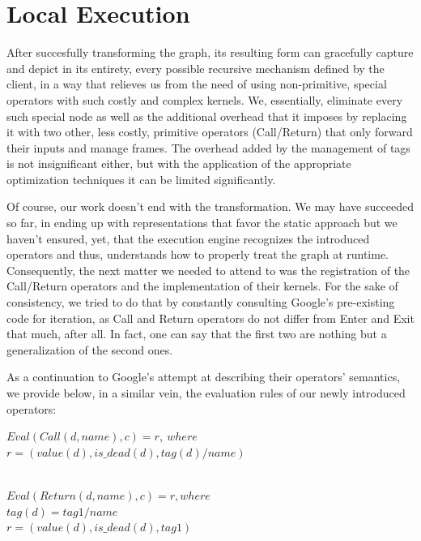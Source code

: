 \documentclass[ack,preface]{dithesis}
\begin{document}
    \section{Local Execution}


After succesfully transforming the graph, its resulting form can gracefully capture and depict in its entirety, every possible recursive mechanism defined by the client, in a way that relieves us from the need of using non-primitive, special operators with such costly and complex kernels. We, essentially,  eliminate every such special node as well as the additional overhead that it imposes by replacing it with two other, less costly, primitive operators (Call/Return) that only forward their inputs and manage frames.  The overhead added by the management of tags is not insignificant either, but with the application of the appropriate optimization techniques it can be limited significantly.

Of course, our work doesn't end with the transformation. We may have succeeded so far, in ending up with representations that favor the static approach but we haven't ensured, yet, that the  execution engine recognizes the introduced operators and thus, understands how to properly treat the graph at runtime. Consequently, the next matter we needed to attend to was the registration of the Call/Return operators and the implementation of their kernels.  For the sake of consistency, we tried to do that by constantly consulting Google's pre-existing code for iteration, as Call and Return operators do not differ from Enter and Exit that much, after all. In fact, one can say that the first two are nothing but a generalization of the second ones. 



\begin{flushleft}
\setlength{\parindent}{20ex}As a continuation to Google's attempt at describing their operators' semantics, we provide below, in a similar vein, 
the evaluation rules of our newly introduced operators:

 $Eval(Call(d, name), c) = r,\  where$ \\
\setlength{\parindent}{25ex} $r = (value(d), is\_dead(d), tag(d)/name)$ 


\setlength{\parindent}{20ex} \ \\
$Eval(Return(d, name), c) = r, where \ $ \\
\setlength{\parindent}{25ex} $tag(d) = tag1/name$\\
$ r = (value(d), is\_dead(d), tag1)$
\end{flushleft}
\end{document}
